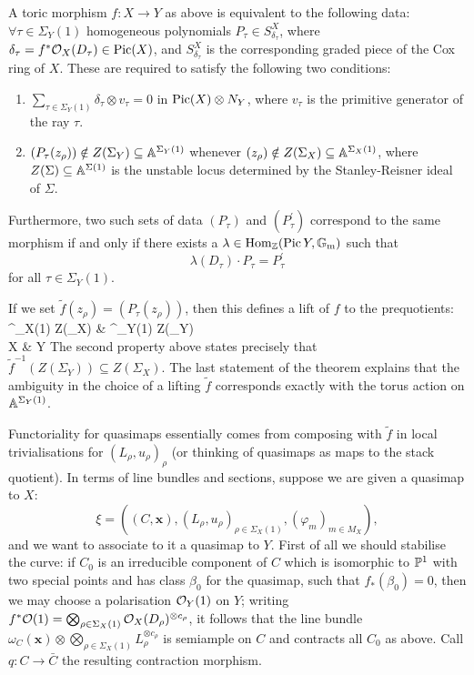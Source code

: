 \begin{thm} \cite[Theorem 3.2]{CoxFunctor} \label{CoxTheorem} A toric morphism $f:X \to Y$ as above is equivalent to the following data: $\forall \tau \in \Sigma_Y(1)$ homogeneous polynomials $P_\tau \in S^X_{\delta_\tau}$,
where $\delta_\tau = f^* \mathcal{O}_X(D_\tau) \in \operatorname{Pic}(X)$, and $S^X_{\delta_\tau}$ is the corresponding graded piece of the Cox ring of $X$. These are required to satisfy the following two conditions:
\begin{enumerate}
\item $\sum_{\tau \in \Sigma_Y(1)} \delta_\tau \otimes v_\tau = 0$ in $\operatorname{Pic}(X) \otimes N_Y$, where $v_\tau$ is the primitive generator of the ray $\tau$.
\item $(P_\tau(z_\rho)) \notin Z(\Sigma_Y) \subseteq \mathbb{A}^{\Sigma_Y(1)}$ whenever $(z_\rho) \notin Z(\Sigma_X) \subseteq \mathbb{A}^{\Sigma_X(1)}$, where $Z(\Sigma)\subseteq\mathbb{A}^{\Sigma(1)}$ is the unstable locus determined by the Stanley-Reisner ideal of $\Sigma$.
\end{enumerate}
Furthermore, two such sets of data $(P_\tau)$ and $(P^\prime_\tau)$ correspond to the same morphism if and only if there exists a $\lambda \in \operatorname{Hom}_{\mathbb{Z}}(\operatorname{Pic} Y, \mathbb{G}_{\text{m}})$ such that
\begin{equation*} \lambda(D_\tau) \cdot P_\tau = P^\prime_\tau \end{equation*}
for all $\tau \in \Sigma_Y(1)$. 
\end{thm}
\noindent If we set $\tilde{f}(z_\rho) = (P_\tau(z_\rho))$, then this defines a lift of $f$ to the prequotients:
\bcd
\Aaff^{\Sigma_X(1)} \setminus Z(\Sigma_X) \ar[r, "\tilde{f}"] \ar[d, "q_X"] & \Aaff^{\Sigma_Y(1)} \setminus Z(\Sigma_Y) \ar[d,"q_Y"] \\
X \ar[r, "f"] & Y
\ecd
The second property above states precisely that $\tilde{f}^{-1}(Z(\Sigma_Y))\subseteq Z(\Sigma_X)$. The last statement of the theorem explains that the ambiguity in the choice of a lifting $\tilde{f}$ corresponds exactly with the torus action on $\mathbb{A}^{\Sigma_Y(1)}$.

Functoriality for quasimaps essentially comes from composing with $\tilde{f}$ in local trivialisations for $(L_\rho,u_\rho)_\rho$ (or thinking of quasimaps as maps to the stack quotient). In terms of line bundles and sections, suppose we are given a quasimap to $X$: \[\xi=\left( (C,\mathbf x),(L_\rho,u_\rho)_{\rho\in\Sigma_X(1)},(\varphi_m)_{m\in M_X}\right),\]
and we want to associate to it a quasimap to $Y$. First of all we should stabilise the curve: if $C_0$ is an irreducible component of $C$ which is isomorphic to $\mathbb P^1$ with two special points and has class $\beta_0$ for the quasimap, such that $f_*(\beta_0)=0$, then we may choose a polarisation $\mathcal{O}_Y(1)$ on $Y$; writing $f^*\mathcal{O}(1)=\bigotimes_{\rho\in\Sigma_X(1)}\mathcal{O}_X(D_\rho)^{\otimes c_\rho}$, it follows that the line bundle $\omega_C(\mathbf x)\otimes \bigotimes_{\rho\in\Sigma_X(1)}L_\rho^{\otimes c_\rho}$ is semiample on $C$ and contracts all $C_0$ as above. Call $q\colon C\to \bar C$ the resulting contraction morphism.

